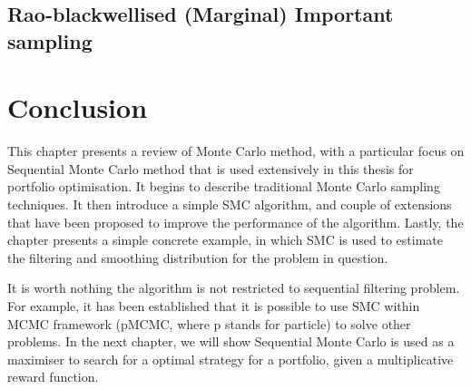 \subsection{Rao-blackwellised (Marginal) Important sampling}

\section{Conclusion}
This chapter presents a review of Monte Carlo method, with a particular focus on Sequential Monte Carlo method that is used extensively in this thesis for portfolio optimisation. It begins to describe traditional Monte Carlo sampling techniques. It then introduce a simple SMC algorithm, and couple of extensions that have been proposed to improve the performance of the algorithm. Lastly, the chapter presents a simple concrete example, in which SMC is used to estimate the filtering and smoothing distribution for the problem in question.

It is worth nothing the algorithm is not restricted to sequential filtering problem. For example, it has been established that it is possible to use SMC within MCMC framework (pMCMC, where p stands for particle) \cite{pMCMC} to solve other problems. In the next chapter, we will show Sequential Monte Carlo is used as a maximiser to search for a optimal strategy for a portfolio, given a multiplicative reward function.

\endinput
\section{Markov chain Monte Carlo (MCMC)}

Markov chain Monte Carlo (MCMC) are a set of algorithms that allows ones to draw random samples from the target probability distribution by constructing a ergotic Markov chain process which has its stationary distribution set to be target desired distribution. 

\subsection{Markov Chain}
Conceptually, Markov chain is a stochastic process in which the past and future states of the process are independent given the current state. A Markov chain can be viewed as an \emph{ordered} sequence of states $\{x_{1:N}\}$, in which state $x_t$ only depends on state $x_{t-1}$, i.e., the state at time $t$ is determined based on some trasition distribution of the form $p(x_t \mid x_{t-1})$, which is independent of all previous states $x_{t-2}, x_{t-3}, \ldots$. 

